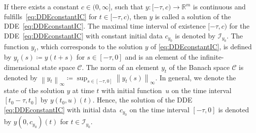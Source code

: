 \documentclass[10pt]{article}
\numberwithin{equation}{section}
\newcommand\norm[1]{\left\lVert#1\right\rVert}
\begin{document}
	If there exists a constant $c\in(0,\infty]$, such that $y:[-\tau,c)\rightarrow \mathbb{R}^m$ is continuous and fulfills~\eqref{eq:DDEconstantIC} for $t\in[-\tau,c)$, then $y$ is called a solution of the DDE~\eqref{eq:DDEconstantIC}. The maximal time interval of existence $[-\tau,c)$ for the DDE~\eqref{eq:DDEconstantIC} with constant initial data $c_{y_0}$ is denoted by $\mathcal{I}_{y_0}$. The function $y_t$, which corresponds to the solution $y$ of \eqref{eq:DDEconstantIC}, is defined by $y_t(s) \coloneqq y(t+s)$ for $s\in[-\tau,0]$ and is an element of the infinite-dimensional state space $\mathcal{C}$.  The norm of an element $y_t$ of the Banach space $\mathcal{C}$ is denoted by $\norm{y_t}_\infty \coloneqq \sup_{s\in[-\tau,0]} \norm{y_t(s)}_\infty$. In general, we denote the state of the solution $y$ at time $t$ with initial function~$u$ on the time interval $[t_0-\tau,t_0]$ by $y(t_0,u)(t)$. Hence, the solution of the DDE \eqref{eq:DDEconstantIC} with initial data~$c_{y_0}$ on the time interval $[-\tau,0]$ is denoted by $y(0,c_{y_0})(t)$ for $t \in \mathcal{I}_{y_0}$.
	
\end{document}
